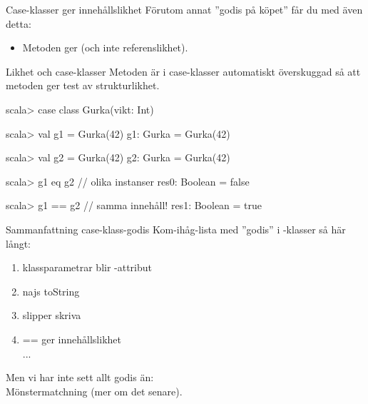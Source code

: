 

\begin{Slide}{Case-klasser ger innehållslikhet}
Förutom annat ''godis på köpet'' får du med  även detta:
\begin{itemize}
\item Metoden \code{==} ger  (och inte referenslikhet).
\end{itemize}
\end{Slide}



\begin{Slide}{Likhet och case-klasser}
Metoden  är i case-klasser automatiskt överskuggad så att metoden \code{==} ger test av strukturlikhet.
\begin{REPL}
scala> case class Gurka(vikt: Int)

scala> val g1 = Gurka(42)
g1: Gurka = Gurka(42)

scala> val g2 = Gurka(42)
g2: Gurka = Gurka(42)

scala> g1 eq g2          // olika instanser
res0: Boolean = false

scala> g1 == g2          // samma innehåll!
res1: Boolean = true
\end{REPL}
\end{Slide}



\begin{Slide}{Sammanfattning case-klass-godis}
Kom-ihåg-lista med ''godis'' i -klasser så här långt:
\begin{enumerate}
\item klassparametrar blir -attribut
\item najs toString
\item slipper skriva 
\item == ger innehållslikhet 
\pause~\\...
\end{enumerate}

\vspace{1em}Men vi har inte sett allt godis än: \\Mönstermatchning (mer om det senare).
\end{Slide}
